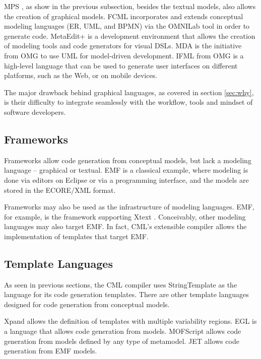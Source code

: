 MPS \cite{voelter}, 
as show in the previous subsection,
besides the textual models, 
also allows the creation of graphical models.
FCML \cite{fcml} incorporates and extends conceptual modeling languages (ER, UML, and BPMN)
via the OMNILab tool in order to generate code.
MetaEdit+ \cite{metaedit} is a development environment that allows the creation of modeling tools
and code generators for visual DSLs.
MDA \cite{mda} is the initiative from OMG to use UML \cite{uml} for model-driven development.
IFML \cite{ifml} from OMG is a high-level language 
that can be used to generate user interfaces on different platforms,
such as the Web, or on mobile devices.

The major drawback behind graphical languages,
as covered in section \ref{sec:why},
is their difficulty to integrate seamlessly with the workflow, tools and mindset of software developers.

\subsection{Frameworks}\label{subsec:frameworks}

Frameworks allow code generation from conceptual models, but lack a modeling language -- graphical or textual. 
EMF \cite{emf} is a classical example,
where modeling is done via editors on Eclipse or via a programming interface,
and the models are stored in the ECORE/XML format. 

Frameworks may also be used as the infrastructure of modeling languages.
EMF, for example, is the framework supporting Xtext \cite{xtext}.
Conceivably, other modeling languages may also target EMF.
In fact, CML's extensible compiler allows the implementation of templates that target EMF.

\subsection{Template Languages}

As seen in previous sections,
the CML compiler uses StringTemplate as the language for its code generation templates.
There are other template languages designed for code generation from conceptual models.

Xpand \cite{xpand} allows the definition of templates with multiple variability regions.
EGL \cite{egl} is a language that allows code generation from models.
MOFScript \cite{mofscript} allows code generation from models defined
by any type of metamodel.
JET \cite{jet} allows code generation from EMF \cite{emf} models.

